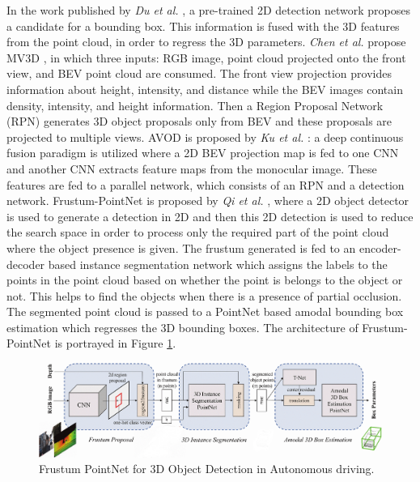 \documentclass[10pt,twocolumn,letterpaper]{article}
\begin{document}
In the work published by \textit{Du et al.} \cite{Du2018}, a pre-trained 2D detection network proposes a candidate for a bounding box. This information is fused with the 3D features from the point cloud, in order to regress the 3D parameters. \textit{Chen et al.} propose MV3D \cite{MV3D2017}, in which three inputs: RGB image, point cloud projected onto the front view, and BEV point cloud are consumed. The front view projection provides information about height, intensity, and distance while the BEV images contain density, intensity, and height information. Then a Region Proposal Network (RPN) generates 3D object proposals only from BEV and these proposals are projected to multiple views. AVOD is proposed by \textit{Ku et al.} \cite{AVOD2018}: a deep continuous fusion paradigm is utilized where a 2D BEV projection map is fed to one CNN and another CNN extracts feature maps from the monocular image. These features are fed to a parallel network, which consists of an RPN and a detection network. Frustum-PointNet is proposed by \textit{Qi et al.} \cite{FPointnet2018}, where a 2D object detector is used to generate a detection in 2D and then this 2D detection is used to reduce the search space in order to process only the required part of the point cloud where the object presence is given. The frustum generated is fed to an encoder-decoder based instance segmentation network which assigns the labels to the points in the point cloud based on whether the point is belongs to the object or not. This helps to find the objects when there is a presence of partial occlusion. The segmented point cloud is passed to a PointNet \cite{Pointnet2017} based amodal bounding box estimation which regresses the 3D bounding boxes. The architecture of Frustum-PointNet \cite{FPointnet2018} is portrayed in Figure \ref{fig:frustumpointnet}.

\begin{figure}
	\centering
	\includegraphics[scale = 0.335]{images/Frustum_PointNet.png}
	\caption{Frustum PointNet for 3D Object Detection in Autonomous driving.\cite[p.3]{FPointnet2018}}
	\label{fig:frustumpointnet}
\end{figure}
\end{document}
